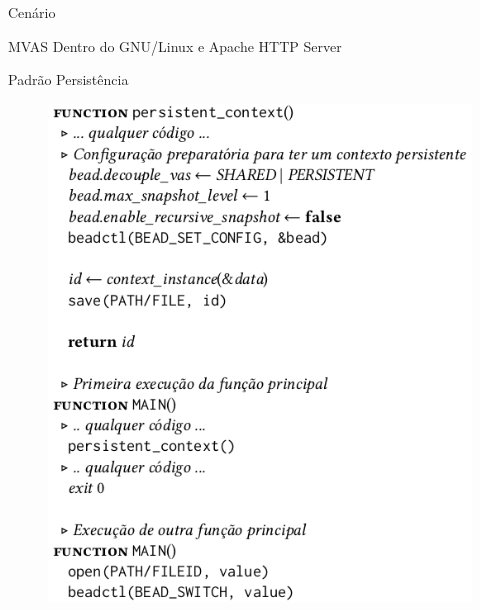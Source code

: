\documentclass[xcolor={usenames,svgnames,dvipsnames},brazil,english,12pt,aspectratio=149]{beamer}
\begin{document}
\begin{frame}{Cenário}
  
  
\end{frame}

\begin{frame}{MVAS Dentro do GNU/Linux e Apache HTTP Server}
  
\end{frame}

\begin{frame}{Padrão Persistência}
  \begin{figure}[!h]
    \centering
    \includegraphics[width=.4\textwidth]{persistente}
  \end{figure}
\end{frame}
\end{document}
